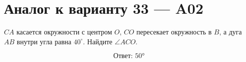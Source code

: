 


\section*{Аналог к варианту 33 — A02}
\(CA\) касается окружности с центром \(O\), \(CO\) пересекает окружность в \(B\), а дуга \(AB\) внутри угла равна \(40^\circ\). Найдите \(\angle ACO\).
\begin{center}\figTangentSecant\end{center}
\[\boxed{\text{Ответ: }50°}\]

